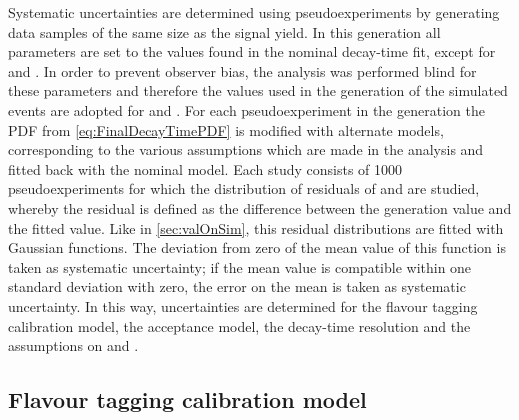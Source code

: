 Systematic uncertainties are determined using pseudoexperiments by generating data samples of the same size as the \BdToDpi signal yield.
In this generation all parameters are set to the values found in the nominal decay-time fit, except for \Sf and \Sfbar.
In order to prevent observer bias, the analysis was performed blind for these parameters and therefore the values used in the generation of the simulated events are adopted for \Sf and \Sfbar.
For each pseudoexperiment in the generation the PDF from \cref{eq:FinalDecayTimePDF} is modified with alternate models, corresponding to the various assumptions which are made in the analysis and fitted back with the nominal model.
Each study consists of \num{1000} pseudoexperiments for which the distribution of residuals of \Sf and \Sfbar are studied, whereby the residual is defined as the difference between the generation value and the fitted value.
Like in \cref{sec:valOnSim}, this residual distributions are fitted with Gaussian functions.
The deviation from zero of the mean value of this function is taken as systematic uncertainty; if the mean value is compatible within one standard deviation with zero, the error on the mean is taken as systematic uncertainty.
In this way, uncertainties are determined for the flavour tagging calibration model, the acceptance model, the decay-time resolution and the assumptions on \DG and \Cf.

\subsection*{Flavour tagging calibration model}

